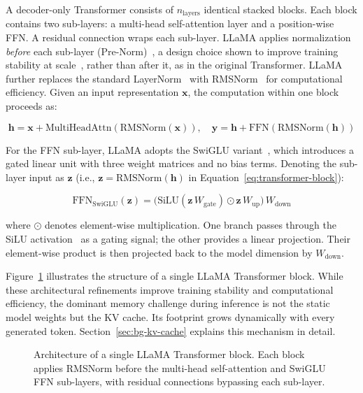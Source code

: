 \documentclass[
english,                 %
bibtex,                  %
]{kththesis}
\numberwithin{listing}{chapter}
\begin{document}
A decoder-only Transformer consists of $n_{\text{layers}}$ identical stacked blocks. Each block contains two sub-layers: a multi-head self-attention layer and a position-wise \gls{FFN}. A residual connection wraps each sub-layer. LLaMA applies normalization \textit{before} each sub-layer (Pre-Norm)~\cite{touvron2023llama, dubey2024llama3}, a design choice shown to improve training stability at scale~\cite{xiong2020layer}, rather than after it, as in the original Transformer. LLaMA further replaces the standard LayerNorm~\cite{ba2016layer} with \gls{RMSNorm}~\cite{zhang2019root} for computational efficiency. Given an input representation $\mathbf{x}$, the computation within one block proceeds as:

\begin{equation}
\label{eq:transformer-block}
\mathbf{h} = \mathbf{x} + \text{MultiHeadAttn}(\text{RMSNorm}(\mathbf{x})), \quad \mathbf{y} = \mathbf{h} + \text{FFN}(\text{RMSNorm}(\mathbf{h}))
\end{equation}

For the \gls{FFN} sub-layer, LLaMA adopts the \gls{SwiGLU} variant~\cite{shazeer2020glu}, which introduces a gated linear unit with three weight matrices and no bias terms. Denoting the sub-layer input as $\mathbf{z}$ (i.e., $\mathbf{z} = \text{RMSNorm}(\mathbf{h})$ in Equation~\ref{eq:transformer-block}):

\begin{equation}
\label{eq:ffn-swiglu}
\text{FFN}_{\text{SwiGLU}}(\mathbf{z}) = \bigl(\text{SiLU}(\mathbf{z}\,W_{\text{gate}}) \odot \mathbf{z}\,W_{\text{up}}\bigr)\,W_{\text{down}}
\end{equation}

\noindent where $\odot$ denotes element-wise multiplication. One branch passes through the SiLU activation~\cite{elfwing2018sigmoid} as a gating signal; the other provides a linear projection. Their element-wise product is then projected back to the model dimension by $W_{\text{down}}$.

Figure~\ref{fig:transformer-block} illustrates the structure of a single LLaMA Transformer block. While these architectural refinements improve training stability and computational efficiency, the dominant memory challenge during inference is not the static model weights but the KV cache. Its footprint grows dynamically with every generated token. Section~\ref{sec:bg-kv-cache} explains this mechanism in detail.


\begin{figure}[H]
  \begin{center}
    
  \end{center}
  \caption{Architecture of a single LLaMA Transformer block. Each block applies \gls{RMSNorm} before the multi-head self-attention and \gls{SwiGLU} \gls{FFN} sub-layers, with residual connections bypassing each sub-layer.}
  \label{fig:transformer-block}
\end{figure}
\end{document}
